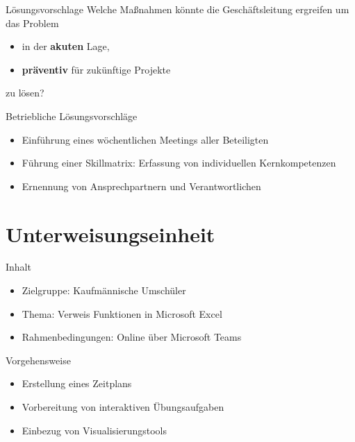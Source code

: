\documentclass[
  10pt,
  ignorenonframetext,
]{beamer}
\providecommand{\tightlist}{%
  \setlength{\itemsep}{0pt}\setlength{\parskip}{0pt}}
\begin{document}
\begin{frame}{Lösungsvorschlage}
\protect\hypertarget{luxf6sungsvorschlage}{}
Welche Maßnahmen könnte die Geschäftsleitung ergreifen um das Problem

\begin{itemize}
\tightlist
\item
  in der \textbf{akuten} Lage,
\item
  \textbf{präventiv} für zukünftige Projekte
\end{itemize}

zu lösen?
\end{frame}

\begin{frame}{Betriebliche Lösungsvorschläge}
\protect\hypertarget{betriebliche-luxf6sungsvorschluxe4ge}{}
\begin{itemize}
\tightlist
\item
  Einführung eines wöchentlichen Meetings aller Beteiligten
\item
  Führung einer Skillmatrix: Erfassung von individuellen Kernkompetenzen
\item
  Ernennung von Ansprechpartnern und Verantwortlichen
\end{itemize}
\end{frame}

\hypertarget{unterweisungseinheit}{%
\section{Unterweisungseinheit}\label{unterweisungseinheit}}

\begin{frame}{Inhalt}
\protect\hypertarget{inhalt}{}
\begin{itemize}
\tightlist
\item
  Zielgruppe: Kaufmännische Umschüler
\item
  Thema: Verweis Funktionen in Microsoft Excel
\item
  Rahmenbedingungen: Online über Microsoft Teams
\end{itemize}
\end{frame}

\begin{frame}{Vorgehensweise}
\protect\hypertarget{vorgehensweise}{}
\begin{itemize}
\tightlist
\item
  Erstellung eines Zeitplans
\item
  Vorbereitung von interaktiven Übungsaufgaben
\item
  Einbezug von Visualisierungstools
\end{itemize}
\end{frame}
\end{document}
